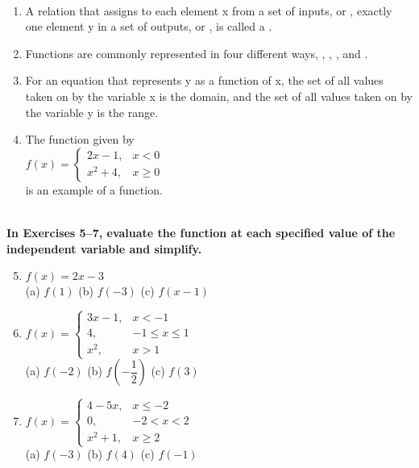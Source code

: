 \begin{exercise}
    ~\\

    \begin{enumerate} 
		\item A relation that assigns to each element x from a set of inputs, or \blank, exactly one element y in a set of outputs, or \blank, is called a \blank. \cite{ci}
		\item Functions are commonly represented in four different ways, \blank, \blank, \blank, and \blank. \cite{ci}
		\item For an equation that represents y as a function of x, the set of all values taken on by the \blank variable x is the domain, and the set of all values taken on by the \blank variable y is the range. \cite{ci}
        \item The function given by\\
		$f(x)=
		\begin{cases}
			2x-1,	& x<0\\
			x^2+4,	& x\geq 0
		\end{cases}$\\
		is an example of a \blank function.
    \end{enumerate}
    ~\\\-\hspace{0.3cm} \textbf{
        In Exercises 5–7, evaluate the function at each specified value of the independent variable and simplify.
    }\\
    \begin{enumerate}
        \setcounter{enumi}{4}
        \item $f(x)=2x-3$\\
        (a) $f(1)$ \qquad (b) $f(-3)$ \qquad (c) $f(x-1)$
        \item $f(x)=
		\begin{cases}
			3x-1,	& x<-1				\\
			4,		& -1 \leq x \leq 1	\\
			x^2,	& x>1
		\end{cases}$\\
        (a) $f(-2)$ \qquad (b) $f(-\dfrac{1}{2})$ \qquad (c) $f(3)$
        \item $f(x)=
		\begin{cases}
			4-5x,	& x\leq -2		\\
			0,		& -2 < x < 2	\\
			x^2+1,	& x\geq 2
		\end{cases}$\\
        (a) $f(-3)$ \qquad (b) $f(4)$ \qquad (c) $f(-1)$
    \end{enumerate}

\end{exercise}
